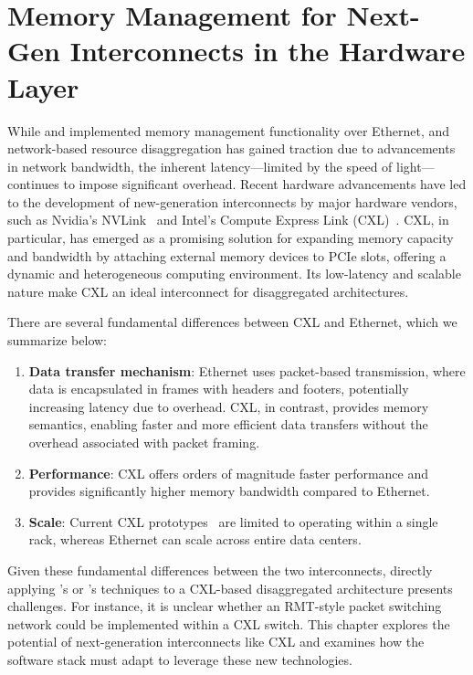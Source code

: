 \chapter{Memory Management for Next-Gen Interconnects in the Hardware Layer}
\label{chap:hardware}
While \mind and \pulse implemented memory management functionality over Ethernet, and network-based resource disaggregation has gained traction due to advancements in network bandwidth, the inherent latency—limited by the speed of light—continues to impose significant overhead. Recent hardware advancements have led to the development of new-generation interconnects by major hardware vendors, such as Nvidia's NVLink~\cite{nvlink} and Intel's Compute Express Link (CXL)~\cite{cxl}. CXL, in particular, has emerged as a promising solution for expanding memory capacity and bandwidth by attaching external memory devices to PCIe slots, offering a dynamic and heterogeneous computing environment. Its low-latency and scalable nature make CXL an ideal interconnect for disaggregated architectures.

There are several fundamental differences between CXL and Ethernet, which we summarize below:
\begin{enumerate}[leftmargin=*, itemsep=0pt]
  \item \textbf{Data transfer mechanism}: Ethernet uses packet-based transmission, where data is encapsulated in frames with headers and footers, potentially increasing latency due to overhead. CXL, in contrast, provides memory semantics, enabling faster and more efficient data transfers without the overhead associated with packet framing.
  \item \textbf{Performance}: CXL offers orders of magnitude faster performance and provides significantly higher memory bandwidth compared to Ethernet.
  \item \textbf{Scale}: Current CXL prototypes~\cite{demystify,cxl2} are limited to operating within a single rack, whereas Ethernet can scale across entire data centers.
\end{enumerate}

Given these fundamental differences between the two interconnects, directly applying \mind's or \pulse's techniques to a CXL-based disaggregated architecture presents challenges. For instance, it is unclear whether an RMT-style packet switching network could be implemented within a CXL switch. This chapter explores the potential of next-generation interconnects like CXL and examines how the software stack must adapt to leverage these new technologies.

